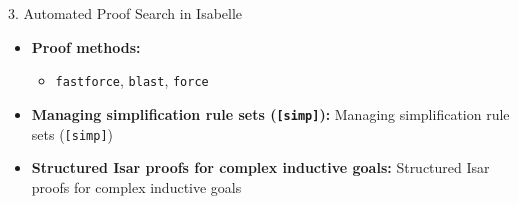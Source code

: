 \documentclass[compress,10pt,xcolor=dvipsnames]{beamer}
\begin{document}
\begin{frame}{3. Automated Proof Search in Isabelle}

\begin{itemize}
  \item \textbf{Proof methods:}
    \begin{itemize}
      \item \texttt{fastforce}, \texttt{blast}, \texttt{force}
    \end{itemize}
  \item \textbf{Managing simplification rule sets (\texttt{[simp]}):} Managing simplification rule sets (\texttt{[simp]})
  \item \textbf{Structured Isar proofs for complex inductive goals:} Structured Isar proofs for complex inductive goals
\end{itemize}
\end{frame}
\end{document}
